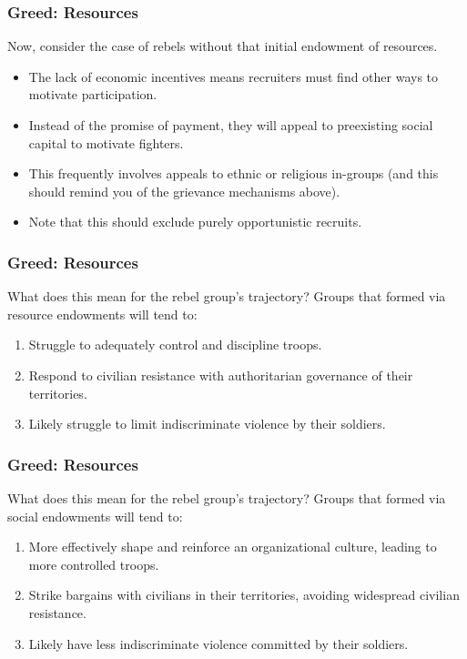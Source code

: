 \documentclass[handout]{beamer}
\begin{document}
\begin{frame} 
	\frametitle{\LARGE{Greed: Resources}}
Now, consider the case of rebels without that initial endowment of resources.
	\begin{itemize}
		\item The lack of economic incentives means recruiters must find other ways to motivate participation. \pause
		\item Instead of the promise of payment, they will appeal to preexisting social capital to motivate fighters. \pause
		\item This frequently involves appeals to ethnic or religious in-groups (and this should remind you of the grievance mechanisms above). \pause
		\item Note that this should exclude purely opportunistic recruits. 
	\end{itemize}
\end{frame}

\begin{frame} 
	\frametitle{\LARGE{Greed: Resources}}
What does this mean for the rebel group's trajectory? Groups that formed via resource endowments will tend to:
		\begin{enumerate}
			\item Struggle to adequately control and discipline troops. \pause
			\item Respond to civilian resistance with authoritarian governance of their territories. \pause
			\item Likely struggle to limit indiscriminate violence by their soldiers.
		\end{enumerate}
\end{frame}

\begin{frame} 
	\frametitle{\LARGE{Greed: Resources}}
	What does this mean for the rebel group's trajectory? Groups that formed via social endowments will tend to:
	\begin{enumerate}
		\item More effectively shape and reinforce an organizational culture, leading to more  controlled troops. \pause
		\item Strike bargains with civilians in their territories, avoiding widespread civilian resistance. \pause
		\item Likely have less indiscriminate violence committed by their soldiers.
	\end{enumerate}
\end{frame}
\end{document}
